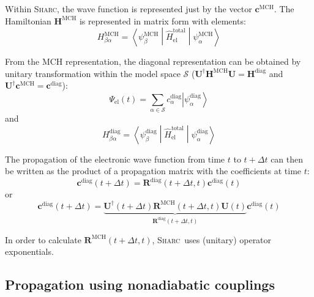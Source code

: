 \documentclass[a4paper,10pt,DIV=15,openany,twoside=false]{scrbook}
\newcommand{\sharc}{\textsc{Sharc}}
\newcommand{\VEC}[1]{\ensuremath{\mathbf{#1}}}
\begin{document}
Within \sharc, the wave function is represented just by the vector $\VEC{c}^{\text{MCH}}$. The Hamiltonian $\VEC{H}^{\text{MCH}}$ is represented in matrix form with elements:
\begin{equation}
  H^{\text{MCH}}_{\beta\alpha}=\left\langle\psi^{\text{MCH}}_\beta\middle|\hat{H}_{\text{el}}^{\text{total}}\middle|\psi^{\text{MCH}}_\alpha\right\rangle
\end{equation}

From the MCH representation, the diagonal representation can be obtained by unitary transformation within the model space $\mathcal{S}$ ($\VEC{U}^\dagger\VEC{H}^{\text{MCH}}\VEC{U}=\VEC{H}^{\text{diag}}$ and $\VEC{U}^\dagger\VEC{c}^{\text{MCH}}=\VEC{c}^{\text{diag}}$):
\begin{equation}
  \Psi_{\text{el}}(t)=\sum\limits_{\alpha\in\mathcal{S}} c^{\text{diag}}_\alpha \left|\psi^{\text{diag}}_\alpha\right\rangle
\end{equation}
and
\begin{equation}
  H^{\text{diag}}_{\beta\alpha}=\left\langle\psi^{\text{diag}}_\beta\middle|\hat{H}_{\text{el}}^{\text{total}}\middle|\psi^{\text{diag}}_\alpha\right\rangle
\end{equation}

The propagation of the electronic wave function from time $t$ to $t+\Delta t$ can then be written as the product of a propagation matrix with the coefficients at time $t$:
\begin{equation}
  \VEC{c}^{\text{diag}}(t+\Delta t)=\VEC{R}^{\text{diag}}(t+\Delta t,t)\VEC{c}^{\text{diag}}(t)
\end{equation}
or
\begin{equation}
  \VEC{c}^{\text{diag}}(t+\Delta t)=\underbrace{\VEC{U}^\dagger(t+\Delta t)\VEC{R}^{\text{MCH}}(t+\Delta t,t)\VEC{U}(t)}_{\VEC{R}^{\text{diag}}(t+\Delta t,t)}\VEC{c}^{\text{diag}}(t)
\end{equation}

In order to calculate $\VEC{R}^{\text{MCH}}(t+\Delta t,t)$, \sharc\ uses (unitary) operator exponentials. 

\subsection{Propagation using nonadiabatic couplings}
\end{document}
